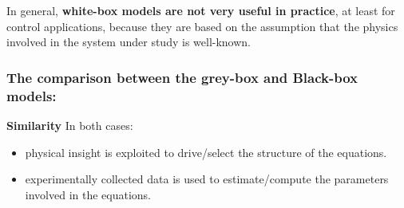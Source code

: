 In general, \textbf{white-box models are not very useful in practice}, at least for control applications, because they are based on the assumption that the physics involved in the system under study is well-known.

\subsubsection{The comparison between the grey-box and Black-box models:}
\textbf{Similarity} 
In both cases:
\begin{itemize}
\item physical insight is exploited to drive/select the structure of the equations.
\item experimentally collected data is used to estimate/compute the parameters involved in the equations.
\end{itemize}

